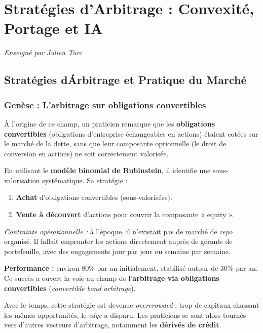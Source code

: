\chapter{Stratégies d'Arbitrage : Convexité, Portage et IA}
\label{chap:arb_convexite}
\textit{Enseigné par Julien Turc}

\section{Stratégies d\'Arbitrage et Pratique du Marché}

\subsection{Genèse : L'arbitrage sur obligations convertibles}

À l'origine de ce champ, un praticien remarque que les \textbf{obligations convertibles} (obligations d'entreprise échangeables en actions) étaient cotées sur le marché de la dette, sans que leur composante optionnelle (le droit de conversion en actions) ne soit correctement valorisée.

\begin{exemple}
En utilisant le \textbf{modèle binomial de Rubinstein}, il identifie une sous-valorisation systématique. Sa stratégie :
\begin{enumerate}
    \item \textbf{Achat} d'obligations convertibles (sous-valorisées).
    \item \textbf{Vente à découvert} d'actions pour couvrir la composante « equity ».
\end{enumerate}
\textit{Contrainte opérationnelle :} à l'époque, il n'existait pas de marché de \textit{repo} organisé. Il fallait emprunter les actions directement auprès de gérants de portefeuille, avec des engagements jour par jour ou semaine par semaine.

\medskip
\textbf{Performance :} environ 80\% par an initialement, stabilisé autour de 30\% par an. Ce succès a ouvert la voie au champ de l'\textbf{arbitrage via obligations convertibles} (\textit{convertible bond arbitrage}).
\end{exemple}

Avec le temps, cette stratégie est devenue \textit{overcrowded} : trop de capitaux chassant les mêmes opportunités, le \textit{edge} a disparu. Les praticiens se sont alors tournés vers d'autres vecteurs d'arbitrage, notamment les \textbf{dérivés de crédit}.

